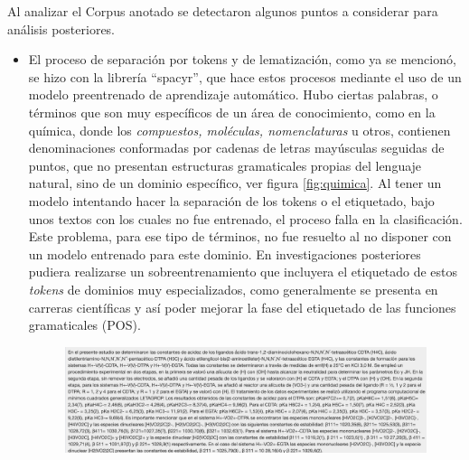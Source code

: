 \documentclass[
  12pt,
  openany]{book}
\begin{document}
Al analizar el Corpus anotado se detectaron algunos puntos a considerar para análisis posteriores.

\begin{itemize}
\item
  El proceso de separación por tokens y de lematización, como ya se mencionó, se hizo con la librería ``spacyr'', que hace estos procesos mediante el uso de un modelo preentrenado de aprendizaje automático. Hubo ciertas palabras, o términos que son muy específicos de un área de conocimiento, como en la química, donde los \emph{compuestos, moléculas, nomenclaturas} u otros, contienen denominaciones conformadas por cadenas de letras mayúsculas seguidas de puntos, que no presentan estructuras gramaticales propias del lenguaje natural, sino de un dominio específico, ver figura \ref{fig:quimica}. Al tener un modelo intentando hacer la separación de los tokens o el etiquetado, bajo unos textos con los cuales no fue entrenado, el proceso falla en la clasificación. Este problema, para ese tipo de términos, no fue resuelto al no disponer con un modelo entrenado para este dominio. En investigaciones posteriores pudiera realizarse un sobreentrenamiento que incluyera el etiquetado de estos \emph{tokens} de dominios muy especializados, como generalmente se presenta en carreras científicas y así poder mejorar la fase del etiquetado de las funciones gramaticales (POS).

  \begin{figure}

  {\centering \includegraphics[width=0.85\linewidth]{images/05-desarrollo/2_ciclo/quimica} 

  }


\end{figure}
\end{itemize}
\end{document}
